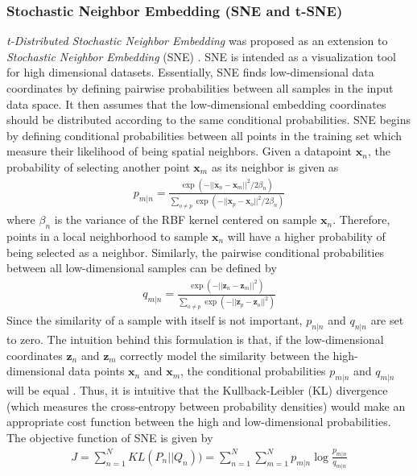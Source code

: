 \subsubsection{Stochastic Neighbor Embedding (SNE and t-SNE)} \label{sec:tSNE}
\textit{t-Distributed Stochastic Neighbor Embedding} \citep{VanDerMaaten2008tSNE} was proposed as an extension to \textit{Stochastic Neighbor Embedding} (SNE) \cite{Hinton2003SNE}. SNE is intended as a visualization tool for high dimensional datasets.  Essentially, SNE finds low-dimensional data coordinates by defining pairwise probabilities between all samples in the input data space.  It then assumes that the low-dimensional embedding coordinates should be distributed according to the same conditional probabilities.  SNE begins by defining conditional probabilities between all points in the training set which measure their likelihood of being spatial neighbors.  Given a datapoint $\bm{x}_{n}$, the probability of selecting another point $\bm{x}_{m}$ as its neighbor is given as
\begin{align} \label{eq:SNE_high_dim_data_probs}
	p_{m|n} = \frac{\exp(-||\bm{x}_{n} - \bm{x}_{m}  ||^{2}/2 \beta_{n})}{\sum_{o \neq p}\exp(-||\bm{x}_{p} - \bm{x}_{o}  ||^{2}/2 \beta_{n})}
\end{align}
\noindent
where $\beta_{n}$ is the variance of the RBF kernel centered on sample $\bm{x}_{n}$.  Therefore, points in a local neighborhood to sample $\bm{x}_{n}$ will have a higher probability of being selected as a neighbor.  Similarly, the pairwise conditional probabilities between all low-dimensional samples can be defined by
\begin{align}
	q_{m|n} = \frac{\exp(-||\bm{z}_{n} - \bm{z}_{m}  ||^{2})}{\sum_{o \neq p}\exp(-||\bm{z}_{p} - \bm{z}_{o}  ||^{2})}
\end{align}
\noindent
Since the similarity of a sample with itself is not important, $p_{n|n}$ and $q_{n|n}$ are set to zero.  The intuition behind this formulation is that, if the low-dimensional coordinates $\bm{z}_{n}$ and $\bm{z}_{m}$ correctly model the similarity between the high-dimensional data points $\bm{x}_{n}$ and $\bm{x}_{m}$, the conditional probabilities $p_{m|n}$ and $q_{m|n}$ will be equal \citep{VanDerMaaten2008tSNE}.  Thus, it is intuitive that the Kullback-Leibler (KL) divergence (which measures the cross-entropy between probability densities) would make an appropriate cost function between the high and low-dimensional probabilities.  The objective function of SNE is given by 
\begin{align}
	J = \sum_{n=1}^{N}KL(P_{n}||Q_{n})) = \sum_{n=1}^{N}\sum_{m=1}^{N} p_{m|n} \log \frac{p_{m|n}}{q_{m|n}}
\end{align} 
